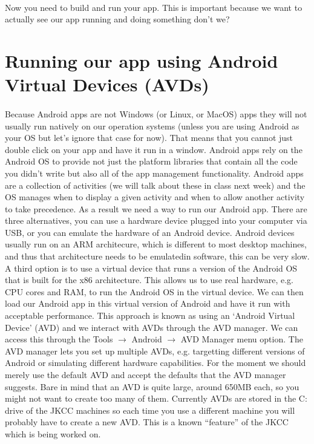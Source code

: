 \documentclass[12pt, a4paper, twoside]{book}
\begin{document}
\paragraph{} Now you need to build and run your app. This is important because we want to actually see our app running and doing something don't we?

\section{Running our app using Android Virtual Devices (AVDs)}
\label{avd}
\paragraph{} Because Android apps are not Windows (or Linux, or MacOS) apps they will not usually run natively on our operation systems (unless you are using Android as your OS but let's ignore that case for now). That means that you cannot just double click on your app and have it run in a window. Android apps rely on the Android OS to provide not just the platform libraries that contain all the code you didn't write but also all of the app management functionality. Android apps are a collection of activities (we will talk about these in class next week) and the OS manages when to display a given activity and when to allow another activity to take precedence. As a result we need a way to run our Android app. There are three alternatives, you can use a hardware device plugged into your computer via USB, or you can emulate the hardware of an Android device. Android devices usually run on an ARM architecure, which is different to most desktop machines, and thus that architecture needs to be emulatedin software, this can be very slow. A third option is to use a virtual device that runs a version of the Android OS that is built for the x86 architecture. This allows us to use real hardware, e.g. CPU cores and RAM, to run the Android OS in the virtual device. We can then load our Android app in this virtual version of Android and have it run with acceptable performance. This approach is known as using an `Android Virtual Device' (AVD) and we interact with AVDs through the AVD manager. We can access this through the Tools $\to$ Android $\to$ AVD Manager menu option. The AVD manager lets you set up multiple AVDs, e.g. targetting different versions of Android or simulating different hardware capabilities. For the moment we should merely use the default AVD and accept the defaults that the AVD manager suggests. Bare in mind that an AVD is quite large, around 650MB each, so you might not want to create too many of them. Currently AVDs are stored in the C: drive of the JKCC machines so each time you use a different machine you will probably have to create a new AVD. This is a known ``feature'' of the JKCC which is being worked on. 
\end{document}

